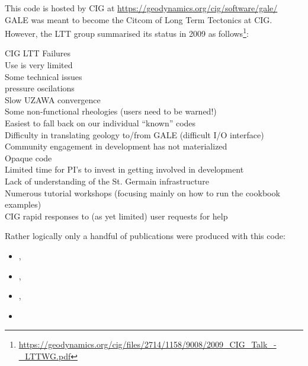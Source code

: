 This code is hosted by CIG at \url{https://geodynamics.org/cig/software/gale/}
GALE was meant to become the Citcom of Long Term Tectonics at CIG. However, 
the LTT group summarised its status in 2009 as 
follows\footnote{\url{https://geodynamics.org/cig/files/2714/1158/9008/2009_CIG_Talk_-_LTTWG.pdf}}:

\hspace{1cm}
\begin{minipage}[t]{0.75\textwidth}
CIG LTT Failures\\
Use is very limited\\
Some technical issues\\
pressure oscilations\\
Slow UZAWA convergence\\
Some non-functional rheologies (users need to be warned!)\\
Easiest to fall back on our individual ``known'' codes\\
Difficulty in translating geology to/from GALE (difficult I/O interface)\\
Community engagement in development has not materialized \\
Opaque code\\
Limited time for PI's to invest in getting involved in development\\
Lack of understanding of the St. Germain infrastructure\\
Numerous tutorial workshops (focusing mainly on how to run the cookbook examples)\\
CIG rapid responses to (as yet limited) user requests for help
\end{minipage}

Rather logically only a handful of publications were produced with this code:

\begin{small}
\begin{itemize}
\item[\twothousandeight]     \textcite{fabs08},  \textcite{gotc08}
\item[\twothousandten]       \textcite{beve10},  \textcite{crmw10}
\item[\twothousandtwelve]    \textcite{lehm12},  \textcite{liqi12}
\item[\twothousandthirteen]  \textcite{arbi13}
\end{itemize}
\end{small}



